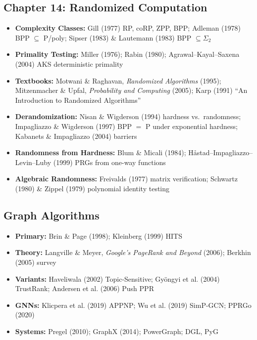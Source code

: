 \subsection{Chapter 14: Randomized Computation}
\begin{itemize}
\item \textbf{Complexity Classes:} Gill (1977) RP, coRP, ZPP, BPP; Adleman (1978) BPP $\subseteq$ P/poly; Sipser (1983) \& Lautemann (1983) BPP $\subseteq \Sigma_2$
\item \textbf{Primality Testing:} Miller (1976); Rabin (1980); Agrawal--Kayal--Saxena (2004) AKS deterministic primality
\item \textbf{Textbooks:} Motwani \& Raghavan, \emph{Randomized Algorithms} (1995); Mitzenmacher \& Upfal, \emph{Probability and Computing} (2005); Karp (1991) ``An Introduction to Randomized Algorithms''
\item \textbf{Derandomization:} Nisan \& Wigderson (1994) hardness vs.\ randomness; Impagliazzo \& Wigderson (1997) BPP $=$ P under exponential hardness; Kabanets \& Impagliazzo (2004) barriers
\item \textbf{Randomness from Hardness:} Blum \& Micali (1984); H\aa{}stad--Impagliazzo--Levin--Luby (1999) PRGs from one-way functions
\item \textbf{Algebraic Randomness:} Freivalds (1977) matrix verification; Schwartz (1980) \& Zippel (1979) polynomial identity testing
\end{itemize}

\subsection{Graph Algorithms}
\begin{itemize}
\item \textbf{Primary:} Brin \& Page (1998); Kleinberg (1999) HITS
\item \textbf{Theory:} Langville \& Meyer, \emph{Google's PageRank and Beyond} (2006); Berkhin (2005) survey
\item \textbf{Variants:} Haveliwala (2002) Topic-Sensitive; Gy\"ongyi et al. (2004) TrustRank; Andersen et al. (2006) Push PPR
\item \textbf{GNNs:} Klicpera et al. (2019) APPNP; Wu et al. (2019) SimP-GCN; PPRGo (2020)
\item \textbf{Systems:} Pregel (2010); GraphX (2014); PowerGraph; DGL, PyG
\end{itemize}

